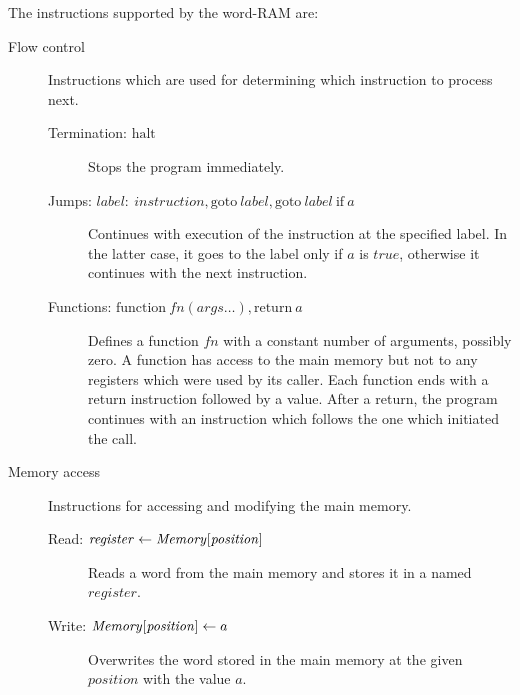 The instructions supported by the word-RAM are:
\begin{description}
	\item[Flow control]
	Instructions which are used for determining which instruction to process next.
	\begin{description}
		\item[Termination: \textnormal{$\textrm{halt}$}]
		Stops the program immediately.
		\item[Jumps: \textnormal{$\mathit{label}{:}\ \mathit{instruction}, \textrm{goto}\ \mathit{label}, \textrm{goto}\ \mathit{label}\ \textrm{if}\ a$}]
		Continues with execution of the instruction at the specified label.
		In the latter case, it goes to the label only if $a$ is $\mathit{true}$, otherwise it continues with the next instruction.
		\item[Functions: \textnormal{$\textrm{function}\ \mathit{fn}(\mathit{args}\ldots), \textrm{return}\ a$}]
		Defines a function $\mathit{fn}$ with a constant number of arguments, possibly zero.
		A function has access to the main memory but not to any registers which were used by its caller.
		Each function ends with a return instruction followed by a value.
		After a return, the program continues with an instruction which follows the one which initiated the call.
	\end{description}
	
	\item[Memory access]
	Instructions for accessing and modifying the main memory.
	\begin{description}
		\item[Read: $\mathit{register} \gets \mathit{Memory}[\mathit{position}\char93$]
		Reads a word from the main memory and stores it in a named $\mathit{register}$.
		\item[Write: $\mathit{Memory}[\mathit{position}\char93 \gets a$]
		Overwrites the word stored in the main memory at the given $position$ with the value $a$.
	\end{description}
	

\end{description}
